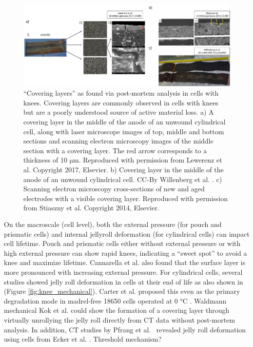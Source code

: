 \documentclass[journal=jpclcd,manuscript=article]{achemso}
\begin{document}
\begin{figure}[ht]
\centering
\includegraphics[scale = 0.5]{figures/CoveringLayers.pdf}
\caption{``Covering layers'' as found via post-mortem analysis in cells with knees. Covering layers are commonly observed in cells with knees but are a poorly understood source of active material loss.
a) A covering layer in the middle of the anode of an unwound cylindrical cell, along with laser microscope images of top, middle and bottom sections and scanning electron microscopy images of the middle section with a covering layer. The red arrow corresponds to a thickness of 10 $\mathrm{\mu m}$. Reproduced with permission from Lewerenz et al. \cite{lewerenz_post-mortem_2017} Copyright 2017, Elsevier. b) Covering layer in the middle of the anode of an unwound cylindrical cell. CC-By Willenberg et al. \cite{willenberg_development_2020}. c) Scanning electron microscopy cross-sections of new and aged electrodes with a visible covering layer. Reproduced with permission from Stiaszny et al. \cite{stiaszny_electrochemical_2014} Copyright 2014, Elsevier.}
\label{fig:covering_layers}
\end{figure}

On the macroscale (cell level), both the external pressure (for pouch and prismatic cells) and internal jellyroll deformation (for cylindrical cells) can impact cell lifetime. Pouch and prismatic cells either without external pressure\cite{wunsch_investigation_2019} or with high external pressure\cite{cannarella_stress_2014} can show rapid knees, indicating a ``sweet spot'' to avoid a knee and maximize lifetime. Cannarella et al.\cite{cannarella_stress_2014} also found that the surface layer is more pronounced with increasing external pressure.
For cylindrical cells, several studies showed jelly roll deformation in cells at their end of life as also shown in (Figure \ref{fig:knee_mechanical})\cite{willenberg_development_2020, willenberg_high-precision_2020}. Carter et al. proposed this even as the primary degradation mode in madrel-free 18650 cells operated at 0 °C \cite{carter_mechanical_2019}.
Waldmann mechanical \cite{waldmann_mechanical_2014}
Kok et al. \cite{kok_virtual_2019} could show the formation of a covering layer through virtually unrollying the jelly roll directly from CT data without post-mortem analysis.
In addition, CT studies by Pfrang et al.~\cite{pfrang_long-term_2018} revealed jelly roll deformation using cells from Ecker et al. \cite{ecker_calendar_2014}. Threshold mechanism?
\end{document}

